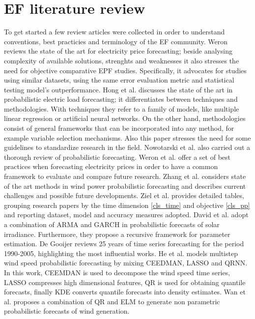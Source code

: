 \section{EF literature review}
To get started a few review articles were collected in order to understand conventions, best practicies and terminology of the EF community.
Weron \cite{EPF_review} reviews the state of the art for electricity price forecasting; beside analysing complexity of available solutions, strenghts and weaknesses it also stresses the need for objective comparative EPF studies. Specifically, it advocates for studies using similar datasets, using the same error evaluation metric and statistical testing model's outperformance.
Hong et al. \cite{prob_elf} discusses the state of the art in probabilistic electric load forecasting; it differentiates between techniques and methodologies. With techniques they refer to a family of models, like multiple linear regression or artificial neural networks. On the other hand, methodologies consist of general frameworks that can be incorporated into any method, for example variable selection mechanisms. Also this paper stresses the need for some guidelines to standardize research in the field.
Nowotarski et al. \cite{nowotarski} also carried out a thorough review of probabilistic forecasting.
Weron et al. \cite{lago} offer a set of best practices when forecasting electricity prices in order to have a common framework to evaluate and compare future research.
Zhang et al. \cite{zhang2014review} considers state of the art methods in wind power probabilistic forecasting and describes current challenges and possible future developments.
Ziel et al. \cite{ziel2018probabilistic} provides detailed tables, grouping research papers by the time dimension \ref{cls_time} and objective \ref{cls_pp} and reporting dataset, model and accuracy 
measures adopted.
David et al. \cite{david2016probabilistic} adopt a combination of ARMA and GARCH in probabilistic forecasts of solar irradiance. Furthermore, they propose a recursive framework for parameter estimation.
De Gooijer \cite{de200625} reviews 25 years of time series forecasting for the period 1990-2005, highlighting the most influential works.
He et al. \cite{he2022cooperative} models  multistep wind speed probabilistic forecasting by mixing CEEDMAN, LASSO and QRNN. In this work, CEEMDAN is used to decompose the wind speed time series, LASSO compresses high dimensional features, QR is used for obtaining quantile forecasts, finally KDE converts quantile forecasts into density estimates.
Wan et al. \cite{wan2016direct} proposes a combination of QR and ELM to generate non parametric probabilistic forecasts of wind generation.
